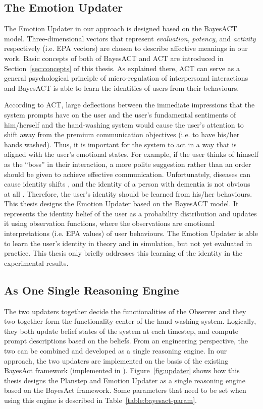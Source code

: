 \subsection{The Emotion Updater}

The Emotion Updater in our approach is designed based on the BayesACT model. Three-dimensional vectors that represent \textit{evaluation}, \textit{potency}, and \textit{activity} respectively (i.e. EPA vectors) are chosen to describe affective meanings in our work. Basic concepts of both of BayesACT and ACT are introduced in Section~\ref{sec:concepts} of this thesis. As explained there, ACT can serve as a general psychological principle of micro-regulation of interpersonal interactions and BayesACT is able to learn the identities of users from their behaviours.

According to ACT, large deflections between the immediate impressions that the system prompts have on the user and the user's fundamental sentiments of him/herself and the hand-washing system would cause the user's attention to shift away from the premium communication objectives (i.e. to have his/her hands washed). Thus, it is important for the system to act in a way that is aligned with the user's emotional states. For example, if the user thinks of himself as the ``boss'' in their interaction, a more polite suggestion rather than an order should be given to achieve effective communication. Unfortunately, diseases can cause identity shifts \cite{lively2011identity}, and the identity of a person with dementia is not obvious at all \cite{orona1990temporality, rose2004memory}. Therefore, the user's identity should be learned from his/her behaviours. This thesis designs the Emotion Updater based on the BayesACT model. It represents the identity belief of the user as a probability distribution and updates it using observation functions, where the observations are emotional interpretations (i.e. EPA values) of user behaviours. The Emotion Updater is able to learn the user's identity in theory and in simulation, but not yet evaluated in practice. This thesis only briefly addresses this learning of the identity in the experimental results. 

\subsection{As One Single Reasoning Engine}
\label{subsec:design-singleengine}

The two updaters together decide the functionalities of the Observer and they two together form the functionality center of the hand-washing system. Logically, they both update belief states of the system at each timestep, and compute prompt descriptions based on the beliefs. From an engineering perspective, the two can be combined and developed as a single reasoning engine. In our approach, the two updaters are implemented on the basis of the existing BayesAct framework (implemented in \cite{hoey2013bayesian}). Figure~\ref{fig:updater} shows how this thesis designs the Planstep and Emotion Updater as a single reasoning engine based on the BayesAct framework. Some parameters that need to be set when using this engine is described in Table~\ref{table:bayesact-param}.

